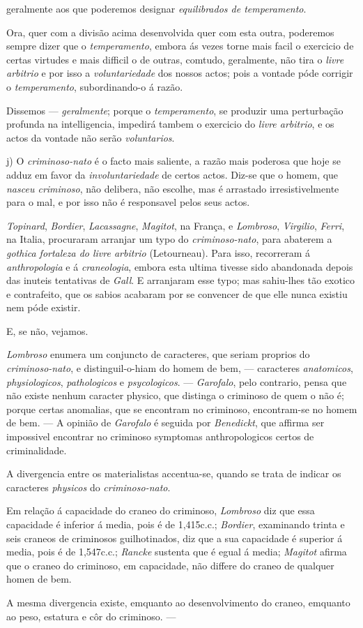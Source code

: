 geralmente aos que poderemos designar \emph{equilibrados de temperamento}.\par Ora, quer com a divisão acima desenvolvida quer com esta outra, poderemos sempre dizer que o \emph{temperamento}, embora ás vezes torne mais facil o exercicio de certas virtudes e mais difficil o de outras, comtudo, geralmente, não tira o \emph{livre arbitrio} e por isso a \emph{voluntariedade} dos nossos actos; pois a vontade póde corrigir o \emph{temperamento}, subordinando-o á razão.\par Dissemos --- \emph{geralmente}; porque o \emph{temperamento}, se produzir uma perturbação profunda na intelligencia, impedirá tambem o exercicio do \emph{livre arbitrio}, e os actos da vontade não serão \emph{voluntarios}.\par j) O \emph{criminoso-nato} é o facto mais saliente, a razão mais poderosa que hoje se adduz em favor da \emph{involuntariedade} de certos actos. Diz-se que o homem, que \emph{nasceu criminoso}, não delibera, não escolhe, mas é arrastado irresistivelmente para o mal, e por isso não é responsavel pelos seus actos.\par \emph{Topinard}, \emph{Bordier}, \emph{Lacassagne}, \emph{Magitot}, na França, e \emph{Lombroso}, \emph{Virgilio}, \emph{Ferri}, na Italia, procuraram arranjar um typo do \emph{criminoso-nato}, para abaterem a \emph{gothica fortaleza do livre arbitrio} (Letourneau). Para isso, recorreram á \emph{anthropologia} e á \emph{craneologia}, embora esta ultima tivesse sido abandonada depois das inuteis tentativas de \emph{Gall}. E arranjaram esse typo; mas sahiu-lhes tão exotico e contrafeito, que os sabios acabaram por se convencer de que elle nunca existiu nem póde existir.\par E, se não, vejamos.\par \emph{Lombroso} enumera um conjuncto de caracteres, que seriam proprios do \emph{criminoso-nato}, e distinguil-o-hiam do homem de bem, --- caracteres \emph{anatomicos}, \emph{physiologicos}, \emph{pathologicos} e \emph{psycologicos}. --- \emph{Garofalo}, pelo contrario, pensa que não existe nenhum caracter physico, que distinga o criminoso de quem o não é; porque certas anomalias, que se encontram no criminoso, encontram-se no homem de bem. --- A opinião de \emph{Garofalo} é seguida por \emph{Benedickt}, que affirma ser impossivel encontrar no criminoso symptomas anthropologicos certos de criminalidade.\par A divergencia entre os materialistas accentua-se, quando se trata de indicar os caracteres \emph{physicos} do \emph{criminoso-nato}.\par Em relação á capacidade do craneo do criminoso, \emph{Lombroso} diz que essa capacidade é inferior á media, pois é de 1,415c.c.; \emph{Bordier}, examinando trinta e seis craneos de criminosos guilhotinados, diz que a sua capacidade é superior á media, pois é de 1,547c.c.; \emph{Rancke} sustenta que é egual á media; \emph{Magitot} afirma que o craneo do criminoso, em capacidade, não differe do craneo de qualquer homen de bem.\par A mesma divergencia existe, emquanto ao desenvolvimento do craneo, emquanto ao peso, estatura e côr do criminoso. --- 